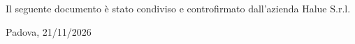 \vspace{2cm}

\begin{center}
    Il seguente documento è stato condiviso e controfirmato dall'azienda Halue S.r.l.
    
    \vspace{0.8cm}
    
    Padova, 21/11/2026
\end{center}